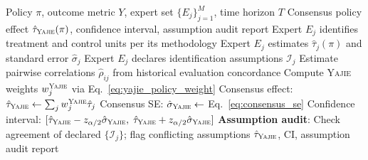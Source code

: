 \documentclass[11pt,a4paper]{article}
\theoremstyle{definition}
\newcommand{\Yajie}{\textsc{Yajie}}
\begin{document}
\begin{algorithm}[htbp]
\caption{\Yajie{} Multi-Expert Policy Evaluation Protocol}
\label{alg:policy_eval}
\begin{algorithmic}[1]
\Require Policy $\pi$, outcome metric $Y$, expert set $\{E_j\}_{j=1}^M$, time horizon $T$
\Ensure Consensus policy effect $\hat{\tau}_{\Yajie}(\pi)$, confidence interval, assumption audit report
    \State Expert $E_j$ identifies treatment and control units per its methodology
    \State Expert $E_j$ estimates $\hat{\tau}_j(\pi)$ and standard error $\hat{\sigma}_j$
    \State Expert $E_j$ declares identification assumptions $\mathcal{I}_j$
\EndFor
\State Estimate pairwise correlations $\hat{\rho}_{ij}$ from historical evaluation concordance
\State Compute \Yajie{} weights $w_j^{\Yajie}$ via Eq.~\eqref{eq:yajie_policy_weight}
\State Consensus effect: $\hat{\tau}_{\Yajie} \gets \sum_j w_j^{\Yajie} \hat{\tau}_j$
\State Consensus SE: $\hat{\sigma}_{\Yajie} \gets$ Eq.~\eqref{eq:consensus_se}
\State Confidence interval: $[\hat{\tau}_{\Yajie} - z_{\alpha/2}\hat{\sigma}_{\Yajie},\; \hat{\tau}_{\Yajie} + z_{\alpha/2}\hat{\sigma}_{\Yajie}]$
\State \textbf{Assumption audit}: Check agreement of declared $\{\mathcal{I}_j\}$; flag conflicting assumptions
\State \Return $\hat{\tau}_{\Yajie}$, CI, assumption audit report
\end{algorithmic}
\end{algorithm}
\end{document}
